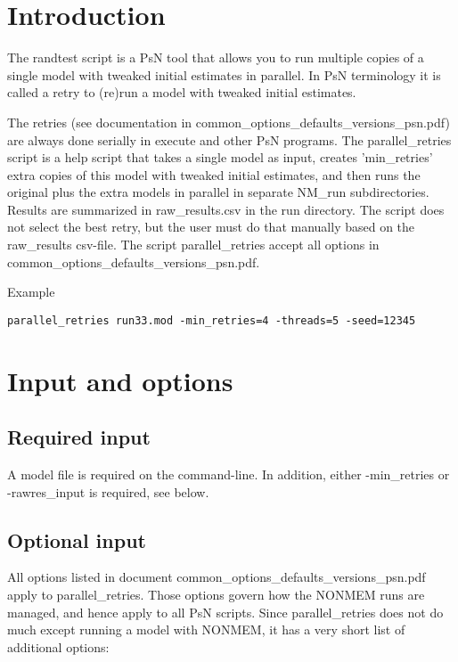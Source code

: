 




\maketitle


\section{Introduction}
The randtest script is a PsN tool that allows you to run 
multiple copies of
a single model with tweaked initial estimates in parallel.
In PsN terminology it is called a retry to (re)run a model with tweaked 
initial estimates.

The retries (see documentation in common\_options\_defaults\_versions\_psn.pdf) 
are always done serially in execute and other PsN programs. 
The parallel\_retries script is a help script that takes a single model 
as input, creates 'min\_retries' extra copies of this model 
with tweaked initial estimates, and then runs the original plus 
the extra models in parallel in separate NM\_run subdirectories. 
Results are summarized in raw\_results.csv in the run directory. 
The script does not select the best retry, but the user must do that manually 
based on the raw\_results csv-file. The script parallel\_retries accept all
options in common\_options\_defaults\_versions\_psn.pdf. 

Example
\begin{verbatim}
parallel_retries run33.mod -min_retries=4 -threads=5 -seed=12345
\end{verbatim}

\section{Input and options}
\subsection{Required input}
A model file is required on the command-line. 
In addition, either -min\_retries or -rawres\_input is required, see below.

\subsection{Optional input}
All options listed in document common\_options\_defaults\_versions\_psn.pdf apply to parallel\_retries. 
Those options govern how the NONMEM runs are managed, and hence apply to all PsN scripts.
Since parallel\_retries does not do much except running a model with NONMEM, 
it has a very short list of additional options:

